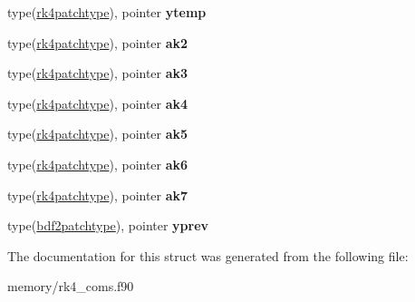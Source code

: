 \begin{DoxyCompactItemize}
\item 
\hypertarget{structrk4__coms_1_1integration__vars_af184f4d350ba697fdbde06218eefac3a}{
type(\hyperlink{structrk4__coms_1_1rk4patchtype}{rk4patchtype}), pointer {\bfseries ytemp}}
\label{structrk4__coms_1_1integration__vars_af184f4d350ba697fdbde06218eefac3a}

\item 
\hypertarget{structrk4__coms_1_1integration__vars_ac21192bd18b6cf605b53524e29f9db2c}{
type(\hyperlink{structrk4__coms_1_1rk4patchtype}{rk4patchtype}), pointer {\bfseries ak2}}
\label{structrk4__coms_1_1integration__vars_ac21192bd18b6cf605b53524e29f9db2c}

\item 
\hypertarget{structrk4__coms_1_1integration__vars_afabcfae946138b55240c7c55d5efc672}{
type(\hyperlink{structrk4__coms_1_1rk4patchtype}{rk4patchtype}), pointer {\bfseries ak3}}
\label{structrk4__coms_1_1integration__vars_afabcfae946138b55240c7c55d5efc672}

\item 
\hypertarget{structrk4__coms_1_1integration__vars_a7c7aefeddd002d69422192287461e937}{
type(\hyperlink{structrk4__coms_1_1rk4patchtype}{rk4patchtype}), pointer {\bfseries ak4}}
\label{structrk4__coms_1_1integration__vars_a7c7aefeddd002d69422192287461e937}

\item 
\hypertarget{structrk4__coms_1_1integration__vars_abbc93ed3dd43079a1c744b84c3abd456}{
type(\hyperlink{structrk4__coms_1_1rk4patchtype}{rk4patchtype}), pointer {\bfseries ak5}}
\label{structrk4__coms_1_1integration__vars_abbc93ed3dd43079a1c744b84c3abd456}

\item 
\hypertarget{structrk4__coms_1_1integration__vars_ad99f48736ebabe9fac7a971e2562d0ed}{
type(\hyperlink{structrk4__coms_1_1rk4patchtype}{rk4patchtype}), pointer {\bfseries ak6}}
\label{structrk4__coms_1_1integration__vars_ad99f48736ebabe9fac7a971e2562d0ed}

\item 
\hypertarget{structrk4__coms_1_1integration__vars_ab442dbee309ffa0745b216e58b47fcd8}{
type(\hyperlink{structrk4__coms_1_1rk4patchtype}{rk4patchtype}), pointer {\bfseries ak7}}
\label{structrk4__coms_1_1integration__vars_ab442dbee309ffa0745b216e58b47fcd8}

\item 
\hypertarget{structrk4__coms_1_1integration__vars_a8900a16e14927612163115ae930d1373}{
type(\hyperlink{structrk4__coms_1_1bdf2patchtype}{bdf2patchtype}), pointer {\bfseries yprev}}
\label{structrk4__coms_1_1integration__vars_a8900a16e14927612163115ae930d1373}

\end{DoxyCompactItemize}


The documentation for this struct was generated from the following file:\begin{DoxyCompactItemize}
\item 
memory/rk4\_\-coms.f90\end{DoxyCompactItemize}
